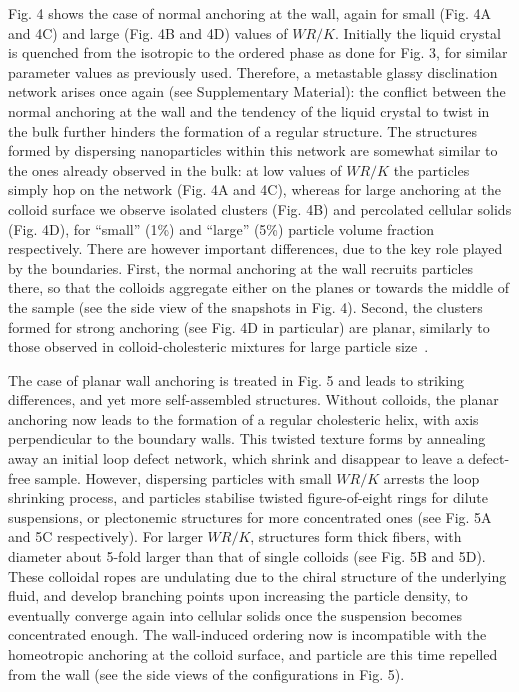 \documentclass[12pt]{article}
\begin{document}
Fig. 4 shows the case of normal anchoring at the wall, again for
small (Fig. 4A and 4C) and large (Fig. 4B and 4D) values of
$WR/K$. Initially the liquid crystal is quenched from the isotropic
to the ordered phase as done for Fig. 3, for similar parameter values 
as previously used. Therefore, a metastable glassy disclination network
arises once again (see Supplementary Material): the conflict between the
normal anchoring at the wall and the tendency of the liquid crystal to
twist in the bulk further hinders the formation of a regular structure.
The structures formed by dispersing nanoparticles within this network
are somewhat similar to the ones already observed in the bulk: at low
values of $WR/K$ the particles simply hop on the network (Fig. 4A and 4C), 
whereas for large anchoring at the colloid surface we observe isolated
clusters (Fig. 4B) and percolated cellular solids (Fig. 4D), for
``small'' (1\%) and ``large'' (5\%) particle volume fraction respectively.
There are however important differences, due to the key role played
by the boundaries. 
First, the normal anchoring at the wall recruits particles there,
so that the colloids aggregate either on the planes or towards the middle of
the sample (see the side view of the snapshots in Fig. 4). Second,
the clusters formed for strong anchoring (see Fig. 4D in particular) 
are planar, similarly to those observed in
colloid-cholesteric mixtures for large particle
size~\cite{niek}.
 
The case of planar wall anchoring is treated in Fig. 5 and leads to
striking differences, and yet more self-assembled structures. 
Without colloids, the planar anchoring now leads to
the formation of a regular cholesteric helix,
with axis perpendicular to the boundary walls. 
This twisted texture forms by annealing away an initial loop defect network,
which shrink and disappear to leave a defect-free sample. However,
dispersing particles with small $WR/K$ arrests the loop shrinking process,
and particles stabilise twisted figure-of-eight rings for dilute
suspensions, or plectonemic structures for more concentrated ones (see Fig. 5A
and 5C respectively). 
For larger $WR/K$, structures form thick fibers, with diameter about
5-fold larger than that of single colloids (see Fig. 5B and 5D). 
These colloidal ropes are undulating due to the chiral structure of the 
underlying fluid, and develop branching points upon increasing the particle
density, to eventually converge again into cellular solids once the suspension
becomes concentrated enough. The wall-induced ordering now is incompatible
with the homeotropic anchoring at the colloid surface, and particle
are this time repelled from the wall (see the side views of the
configurations in Fig. 5).
\end{document}
